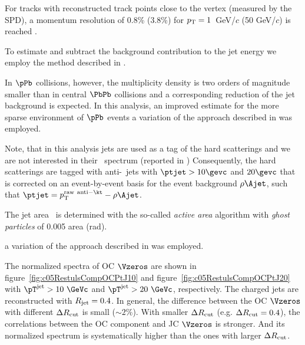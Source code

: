 For tracks with reconstructed track points close to the vertex (measured by the SPD), a momentum resolution of  0.8\% (3.8\%) for $p_{\mathrm{T}} = 1$~GeV/$c$ (50 GeV/$c$) is reached \cite{Abelev:2014ffa}.

To estimate and subtract the background contribution to the jet energy we employ the method described in \cite{Adam:2015hoa,Abelev:2013kqa}.

In $\pPb$ collisions, however, the multiplicity density is two orders of magnitude smaller than in central $\PbPb$ collisions \cite{ALICE:2012xs} and a corresponding reduction of the jet background is expected.
In this analysis, an improved estimate for the more sparse environment of $\pPb$ events a variation \cite{Adam:2015hoa} of the approach described in \cite{Chatrchyan:2012tt} was employed.

Note, that in this analysis jets are used as a tag of the hard scatterings and we are not interested in their \pt\ spectrum (reported in )
Consequently, the hard scatterings are tagged with anti-\kt\ jets with $\ptjet > 10 \gevc$ and $20 \gevc$ that is corrected on an event-by-event basis for the event background $\rho \Ajet$, such that $\ptjet = \pt^{{\rm raw~anti-\kt}} - \rho \Ajet$.

The jet area \Ajet\ is determined with the so-called \emph{active area} algorithm \cite{Cacciari:2008gn} with \emph{ghost particles} of 0.005 area (rad).

a variation  of the approach described in \cite{Chatrchyan:2012tt} was employed.



The normalized spectra of OC $\Vzeros$ are shown in
figure~\ref{fig:c05RestulsCompOCPtJ10} and
figure~\ref{fig:c05RestulsCompOCPtJ20} with $\pT^{\rm jet}>10~\GeVc$ and
$\pT^{\rm jet}>20~\GeVc$, respectively.
The charged jets are reconstructed with $R_{\rm jet}=0.4$.
In general, the difference between the OC $\Vzeros$ with
different $\Delta R_{\rm cut}$ is small ($\sim 2\%$).
With smaller $\Delta R_{\rm cut}$ (e.g. $\Delta R_{\rm cut}=0.4$),
the correlations between the OC component and JC $\Vzeros$ is stronger.
And its normalized spectrum is systematically higher
than the ones with  larger $\Delta R_{\rm cut}$.



